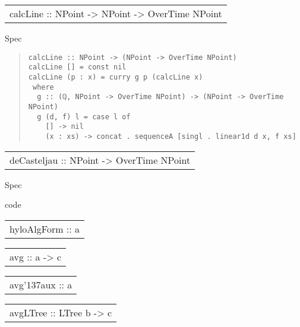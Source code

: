 \begin{haddockdesc}
\item[\begin{tabular}{@{}l}
calcLine :: NPoint -> NPoint -> OverTime NPoint
\end{tabular}]
{\haddockbegindoc
Spec\par
\begin{quote}
{\haddockverb\begin{verbatim}
calcLine :: NPoint -> (NPoint -> OverTime NPoint)
calcLine [] = const nil
calcLine (p : x) = curry g p (calcLine x)
 where
  g :: (ℚ, NPoint -> OverTime NPoint) -> (NPoint -> OverTime NPoint)
  g (d, f) l = case l of
    [] -> nil
    (x : xs) -> concat . sequenceA [singl . linear1d d x, f xs]
\end{verbatim}}
\end{quote}}
\end{haddockdesc}
\begin{haddockdesc}
\item[\begin{tabular}{@{}l}
deCasteljau :: {\char 91}NPoint{\char 93} -> OverTime NPoint
\end{tabular}]
{\haddockbegindoc
Spec\par
{}code\par}
\end{haddockdesc}
\begin{haddockdesc}
\item[\begin{tabular}{@{}l}
hyloAlgForm :: a
\end{tabular}]
\item[\begin{tabular}{@{}l}
avg :: a -> c
\end{tabular}]
\item[\begin{tabular}{@{}l}
avg{\char '137}aux :: a
\end{tabular}]
\item[\begin{tabular}{@{}l}
avgLTree :: LTree b -> c
\end{tabular}]
\end{haddockdesc}